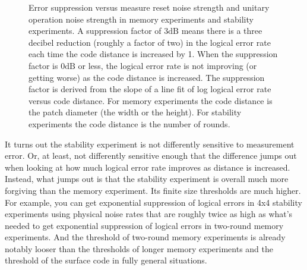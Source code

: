 \documentclass[onecolumn,unpublished,a4paper]{quantumarticle}
\theoremstyle{definition}
\theoremstyle{definition}
\theoremstyle{definition}
\begin{document}
\begin{figure}
    \centering
    \caption{
        Error suppression versus measure reset noise strength and unitary operation noise strength in memory experiments and stability experiments.
        A suppression factor of $3\text{dB}$ means there is a three decibel reduction (roughly a factor of two) in the logical error rate each time the code distance is increased by 1.
        When the suppression factor is $0\text{dB}$ or less, the logical error rate is not improving (or getting worse) as the code distance is increased.
        The suppression factor is derived from the slope of a line fit of log logical error rate versus code distance.
        For memory experiments the code distance is the patch diameter (the width or the height).
        For stability experiments the code distance is the number of rounds.
    }
    \label{fig:stability_sim_mr}
\end{figure}

It turns out the stability experiment is not differently sensitive to measurement error.
Or, at least, not differently sensitive enough that the difference jumps out when looking at how much logical error rate improves as distance is increased.
Instead, what jumps out is that the stability experiment is overall much more forgiving than the memory experiment.
Its finite size thresholds are much higher.
For example, you can get exponential suppression of logical errors in 4x4 stability experiments using physical noise rates that are roughly twice as high as what's needed to get exponential suppression of logical errors in two-round memory experiments.
And the threshold of two-round memory experiments is already notably looser than the thresholds of longer memory experiments and the threshold of the surface code in fully general situations.
\end{document}
